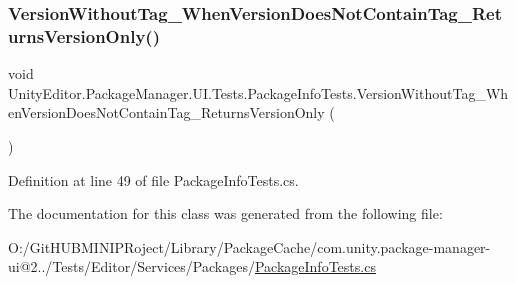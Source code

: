 \subsubsection{\texorpdfstring{VersionWithoutTag\_WhenVersionDoesNotContainTag\_ReturnsVersionOnly()}{VersionWithoutTag\_WhenVersionDoesNotContainTag\_ReturnsVersionOnly()}}
{\footnotesize\ttfamily void Unity\+Editor.\+Package\+Manager.\+U\+I.\+Tests.\+Package\+Info\+Tests.\+Version\+Without\+Tag\+\_\+\+When\+Version\+Does\+Not\+Contain\+Tag\+\_\+\+Returns\+Version\+Only (\begin{DoxyParamCaption}{ }\end{DoxyParamCaption})}



Definition at line 49 of file Package\+Info\+Tests.\+cs.



The documentation for this class was generated from the following file\+:\begin{DoxyCompactItemize}
\item 
O\+:/\+Git\+H\+U\+B\+M\+I\+N\+I\+P\+Roject/\+Library/\+Package\+Cache/com.\+unity.\+package-\/manager-\/ui@2../\+Tests/\+Editor/\+Services/\+Packages/\mbox{\hyperlink{_package_info_tests_8cs}{Package\+Info\+Tests.\+cs}}\end{DoxyCompactItemize}
